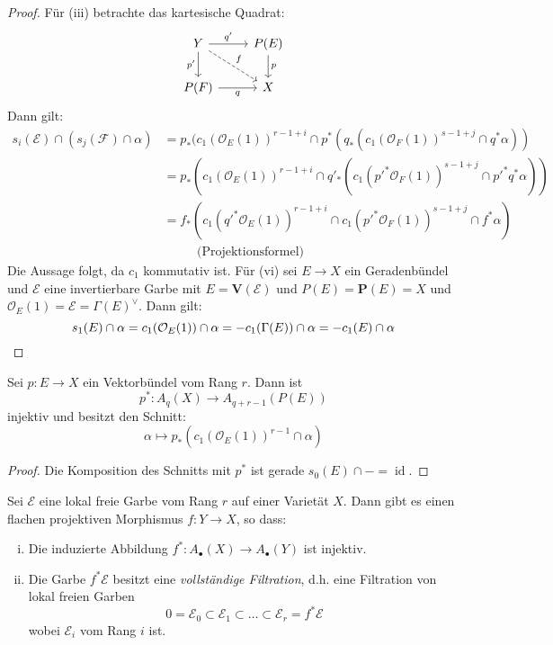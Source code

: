 \documentclass[10pt,a4paper]{article}
\begin{document}
\begin{proof}
Für (iii) betrachte das kartesische Quadrat:
\[ \begin{tikzcd}
Y \rar["q'"]\dar["p'"']\ar[rd, "f", dashed] & P(E) \dar["p"]\\
P(F)\rar["q"'] & X
\end{tikzcd} \]
Dann gilt:
\begin{align*}
s_i(\mathcal{E})\cap (s_j(\mathcal{F})\cap \alpha) &= p_\ast (c_1(\mathcal{O}_E(1))^{r-1+i} \cap p^\ast(q_\ast(c_1(\mathcal{O}_F(1))^{s-1+j}\cap q^\ast \alpha))\\
&= p_\ast(c_1(\mathcal{O}_E(1))^{r-1+i}\cap q'_\ast(c_1(p'^\ast\mathcal{O}_F (1))^{s-1+j}\cap p'^\ast q^\ast\alpha))\\
&= f_\ast(c_1(q'^\ast\mathcal{O}_E(1))^{r-1+i}\cap c_1(p'^\ast\mathcal{O}_F (1))^{s-1+j}\cap f^\ast\alpha)\\
&\phantom{==} \text{(Projektionsformel)}
\end{align*}
Die Aussage folgt, da $c_1$ kommutativ ist. Für (vi) sei $E\to X$ ein Geradenbündel und $\mathcal{E}$ eine invertierbare Garbe mit $E=\mathbf{V}(\mathcal{E})$ und $P(E)=\mathbf{P}(E)=X$ und $\mathcal{O}_E(1)=\mathcal{E} = \Gamma(E)^\vee$. Dann gilt:
\[ s_1(E)\cap \alpha = c_1(\mathcal{O}_E(1))\cap\alpha = -c_1(\Gamma(E))\cap\alpha = -c_1(E)\cap\alpha\qedhere \]
\end{proof}

\begin{corollary}
Sei $p:E\to X$ ein Vektorbündel vom Rang $r$. Dann ist
\[ p^\ast: A_q(X)\to A_{q+r-1}(P(E)) \]
injektiv und besitzt den Schnitt:
\[ \alpha\mapsto p_\ast(c_1(\mathcal{O}_E(1))^{r-1}\cap\alpha) \]
\end{corollary}

\begin{proof}
Die Komposition des Schnitts mit $p^\ast$ ist gerade $s_0(E)\cap - = \operatorname{id}$.
\end{proof}

\begin{corollary}
Sei $\mathcal{E}$ eine lokal freie Garbe vom Rang $r$ auf einer Varietät $X$. Dann gibt es einen flachen projektiven Morphismus $f:Y\to X$, so dass:
\begin{enumerate}[(i)]
\item Die induzierte Abbildung $f^\ast:A_\bullet(X)\to A_\bullet(Y)$ ist injektiv.
\item Die Garbe $f^\ast\mathcal{E}$ besitzt eine \textit{vollständige Filtration}, d.h. eine Filtration von lokal freien Garben
\[ 0 = \mathcal{E}_0 \subset \mathcal{E}_1 \subset\ldots\subset \mathcal{E}_r = f^\ast\mathcal{E} \]
wobei $\mathcal{E}_i$ vom Rang $i$ ist.
\end{enumerate}
\end{corollary}
\end{document}
